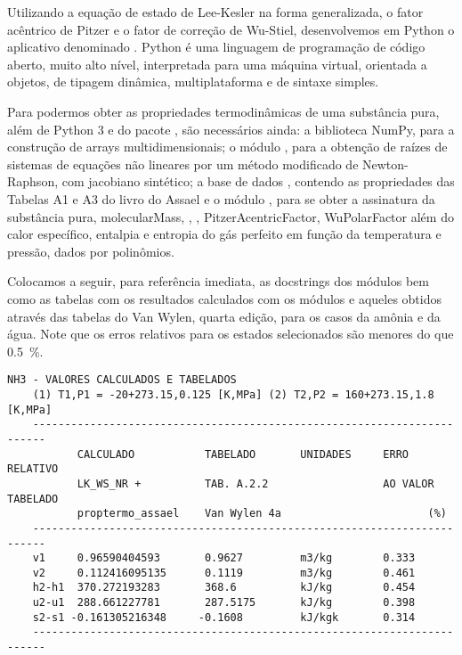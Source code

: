     Utilizando a equação de estado de Lee-Kesler na forma generalizada, o fator
    acêntrico de Pitzer e o fator de correção de Wu-Stiel, desenvolvemos em
    Python o aplicativo denominado . Python é uma
    linguagem de programação de código aberto, muito alto nível, interpretada
    para uma máquina virtual, orientada a objetos, de tipagem dinâmica,
    multiplataforma e de sintaxe simples.

    Para podermos obter as propriedades termodinâmicas de uma substância pura,
    além de Python 3 e do pacote , são necessários
    ainda: a biblioteca NumPy, para a construção de arrays multidimensionais; o
    módulo , para a obtenção de raízes de sistemas de
    equações não lineares por um método modificado de Newton-Raphson, com
    jacobiano sintético; a base de dados , contendo as
    propriedades das Tabelas A1 e A3 do livro do Assael e o módulo
    , para se obter  a assinatura da substância pura,
    \gls{molecularMass}, ,
    , \gls{PitzerAcentricFactor}, \gls{WuPolarFactor}
    além do calor específico, entalpia e entropia do gás perfeito em função da
    temperatura e pressão, dados por polinômios.

    Colocamos a seguir, para referência imediata, as docstrings dos módulos bem
    como as tabelas com os resultados calculados com os módulos e aqueles
    obtidos através das tabelas do Van Wylen, quarta edição, para os casos da
    amônia e da água. Note que os erros relativos para os estados selecionados
    são menores do que \SI{0.5}{\percent}.

    \begin{Verbatim}[baselinestretch=1.0]
                NH3 - VALORES CALCULADOS E TABELADOS
    (1) T1,P1 = -20+273.15,0.125 [K,MPa] (2) T2,P2 = 160+273.15,1.8  [K,MPa]
    ------------------------------------------------------------------------
           CALCULADO           TABELADO       UNIDADES     ERRO RELATIVO
           LK_WS_NR +          TAB. A.2.2                  AO VALOR TABELADO
           proptermo_assael    Van Wylen 4a                       (%)
    ------------------------------------------------------------------------
    v1     0.96590404593       0.9627         m3/kg        0.333
    v2     0.112416095135      0.1119         m3/kg        0.461
    h2-h1  370.272193283       368.6          kJ/kg        0.454
    u2-u1  288.661227781       287.5175       kJ/kg        0.398
    s2-s1 -0.161305216348     -0.1608         kJ/kgk       0.314
    ------------------------------------------------------------------------
    \end{Verbatim}


